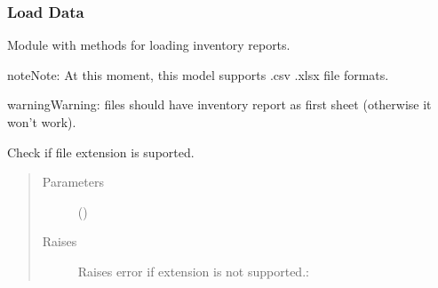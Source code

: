 \documentclass[letterpaper,10pt,english]{sphinxmanual}
\begin{document}
\subsubsection{Load Data}
\label{\detokenize{source/optimization.opt_tools:module-optimization.opt_tools.load_data}}\label{\detokenize{source/optimization.opt_tools:load-data}}
Module with methods for loading inventory reports.

\begin{sphinxadmonition}{note}{Note:}
At this moment, this model supports .csv .xlsx file formats.
\end{sphinxadmonition}

\begin{sphinxadmonition}{warning}{Warning:}
 files should have inventory report as first sheet (otherwise it won’t work).
\end{sphinxadmonition}

\begin{fulllineitems}
\label{\detokenize{source/optimization.opt_tools:optimization.opt_tools.load_data.check_extension}}
Check if file extension is suported.
\begin{quote}\begin{description}
\item[{Parameters}] \leavevmode
\sphinxstyleliteralstrong{\sphinxupquote{(}}\sphinxstyleliteralstrong{\sphinxupquote{)}} () \textendash{} 

\item[{Raises}] \leavevmode
{} \textendash{} Raises error if extension is not supported.:

\end{description}\end{quote}

\end{fulllineitems}
\end{document}
